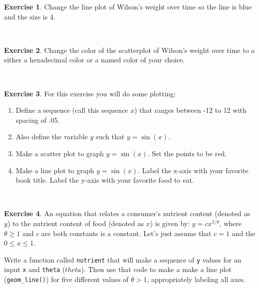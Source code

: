 \documentclass[
]{book}
\theoremstyle{definition}
\theoremstyle{definition}
\theoremstyle{definition}
\newtheorem{exercise}{Exercise}[chapter]
\theoremstyle{remark}
\begin{document}
\begin{exercise}
\protect\hypertarget{exr:unnamed-chunk-42}{}{\label{exr:unnamed-chunk-42} }Change the line plot of Wilson's weight over time so the line is blue and the size is 4.
\end{exercise}
~

\begin{exercise}
\protect\hypertarget{exr:unnamed-chunk-43}{}{\label{exr:unnamed-chunk-43} }Change the color of the scatterplot of Wilson's weight over time to a either a hexadecimal color or a named color of your choice.
\end{exercise}
~

\begin{exercise}
\protect\hypertarget{exr:unnamed-chunk-44}{}{\label{exr:unnamed-chunk-44} }For this exercise you will do some plotting:

\begin{enumerate}[label=\alph*.]
\item Define a sequence (call this sequence $x$) that ranges between -12 to 12 with spacing of .05.
\item Also define the variable $y$ such that $y=\sin(x)$.
\item Make a scatter plot to graph $y=\sin(x)$.  Set the points to be red.
\item Make a line plot to graph $y=\sin(x)$.  Label the x-axis with your favorite book title. Label the y-axis with your favorite food to eat.
\end{enumerate}
\end{exercise}

~

\begin{exercise}
\protect\hypertarget{exr:unnamed-chunk-45}{}{\label{exr:unnamed-chunk-45} }An equation that relates a consumer's nutrient content (denoted as \(y\)) to the nutrient content of food (denoted as \(x\)) is given by: \(\displaystyle y = c x^{1/\theta}\), where \(\theta \geq 1\) and \(c\) are both constants is a constant. Let's just assume that \(c=1\) and the \(0 \leq x \leq 1\).

Write a function called \texttt{nutrient} that will make a sequence of \texttt{y} values for an input \texttt{x} and \texttt{theta} (\(theta\)). Then use that code to make a make a line plot (\texttt{geom\_line()}) for five different values of \(\theta>1\), appropriately labeling all axes.
\end{exercise}
~
\end{document}
